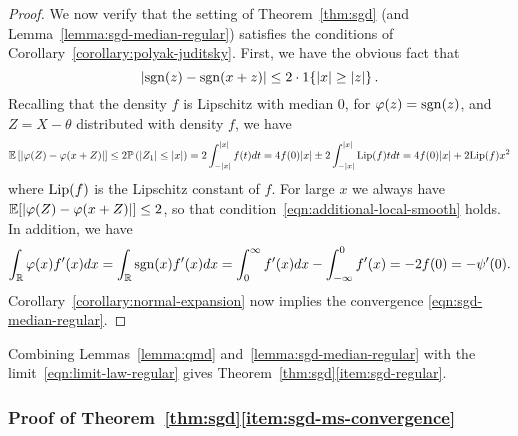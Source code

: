 \begin{proof}
  We now verify that the setting of Theorem~\ref{thm:sgd}
  (and Lemma~\ref{lemma:sgd-median-regular}) satisfies the
  conditions of Corollary~\ref{corollary:polyak-juditsky}. First, we have
  the obvious fact that
  \begin{equation*}
    |\mathrm{sgn}(z) - \mathrm{sgn}(x + z)|
    \le 2 \cdot 1\!\left\{|x| \ge |z|\right\}.
  \end{equation*}
  Recalling that the density $f$ is Lipschitz with median 0,
  for $\varphi(z) = \mathrm{sgn}(z)$, and $Z = X - \theta$ distributed with
  density $f$, we have
  \begin{align*}
    \mathbb{E}\left[  \left| \varphi(Z) - \varphi(x + Z) \right| \right]
    \leq 2 \mathbb{P}\left( |Z_1| \le |x|  \right)
    = 2 \int_{-|x|}^{|x|} f(t) dt
    = 4 f(0)|x| \pm 2 \int_{-|x|}^{|x|}
    {\rm \textup{Lip}}(f) t dt
    = 4 f(0) |x| + 2 {\rm \textup{Lip}}(f) x^2
  \end{align*}
  where ${\rm \textup{Lip}}(f)$ is the Lipschitz constant of $f$.
  For large $x$ we always have
  $\mathbb{E}[|\varphi(Z) - \varphi(x + Z)|] \le 2$, so that
  condition~\eqref{eqn:additional-local-smooth} holds.
  In addition, we have
  \begin{equation*}
    \int_{\mathbb{R}} \varphi(x) f'(x ) dx
    = \int_{\mathbb{R}} \mathrm{sgn}(x) f'(x ) dx =
    \int_0^\infty f'(x ) dx
    - \int_{-\infty}^0 f'(x )
    = -2 f(0) = -\psi'(0).
  \end{equation*}
  Corollary~\ref{corollary:normal-expansion}
  now implies the convergence \eqref{eqn:sgd-median-regular}.
\end{proof}

Combining Lemmas~\ref{lemma:qmd} and~\ref{lemma:sgd-median-regular}
with the limit~\eqref{eqn:limit-law-regular} gives
Theorem~\ref{thm:sgd}\eqref{item:sgd-regular}.

\subsubsection*{Proof of Theorem~\ref{thm:sgd}\eqref{item:sgd-ms-convergence}}


